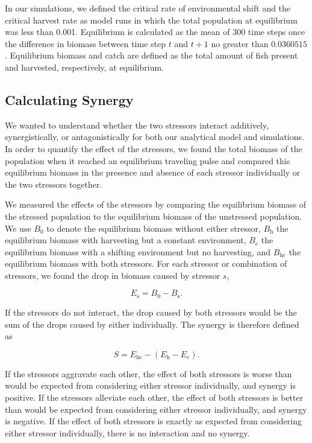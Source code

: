 \documentclass[]{article}
\begin{document}
In our simulations, we defined the critical rate of environmental shift and the critical harvest rate as model runs 
in which the total population at equilibrium was less than 0.001. Equilibrium is calculated as the mean of 300 time steps once the difference in biomass between time step $t$ and $t+1$ no greater than $0.0360515$. Equilibrium biomass and catch are defined as the total amount of fish present and harvested, respectively, at equilibrium. 

\subsection{Calculating Synergy }

We wanted to understand whether the two stressors interact 
additively, synergistically, or antagonistically \citep{Crainetal2008} for both our analytical model and simulations. In order to quantify the effect of the 
stressors, we found the total biomass of the population when it reached an equilibrium traveling pulse and 
compared this equilibrium biomass in the presence and absence of each stressor individually or the two stressors together. 

We measured the effects of the stressors by comparing the equilibrium biomass of the stressed population to 
the equilibrium biomass of the unstressed population. We use $B_0$ to denote the equilibrium biomass 
without either stressor, $B_\text{h}$ the equilibrium biomass with harvesting but a constant environment, $B_\text{c}$ the 
equilibrium biomass with a shifting environment but no harvesting, and $B_\text{hc}$ the equilibrium biomass with 
both stressors. For each stressor or combination of stressors, we found the drop in  biomass caused 
by stressor $s$,

\[E_\text{s}=B_0-B_\text{s}.\]

\noindent If the stressors do not interact, the drop caused by both stressors would be the sum of the drops caused by 
either individually. The synergy is therefore defined as

\[S = E_\text{hc}-\left(E_\text{h}-E_\text{c}\right).\]

\noindent If the stressors aggravate each other, the effect of both stressors is worse than would be expected from 
considering either stressor individually, and synergy is positive. If the stressors alleviate each other, the effect 
of both stressors is better than would be expected from considering either stressor individually, and synergy is 
negative. If the effect of both stressors is exactly as expected from considering either stressor individually, 
there is no interaction and no synergy.
\end{document}
